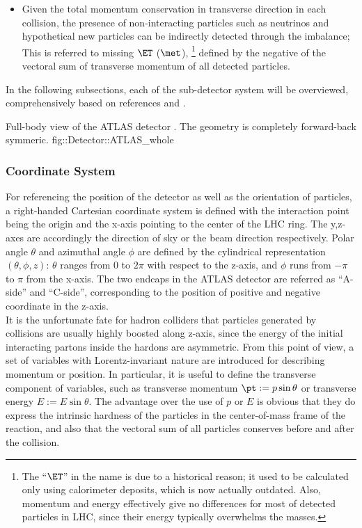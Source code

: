 \begin{itemize}
\item Given the total momentum conservation in transverse direction in each collision, 
the presence of non-interacting particles such as neutrinos and hypothetical new particles can be indirectly detected through the imbalance; 
This is referred to missing $\ET$ ($\met$), 
\footnote{The ``$\ET$'' in the name is due to a historical reason; it used to be calculated only using calorimeter deposits, which is now actually outdated. 
Also, momentum and energy effectively give no differences for most of detected particles in LHC, since their energy typically overwhelms the masses.}
defined by the negative of the vectoral sum of transverse momentum of all detected particles.
\end{itemize}


In the following subsections, each of the sub-detector system will be overviewed, comprehensively based on references \cite{ATLAS_exp} and \cite{ATLAS_TDR}.

{Full-body view of the ATLAS detector \cite{ATLAScosmicPerf}. The geometry is completely forward-back symmeric.}
{fig::Detector::ATLAS_whole}


\subsubsection{Coordinate System}
For referencing the position of the detector as well as the orientation of particles, a right-handed Cartesian coordinate system is defined with the interaction point being the origin and the x-axis pointing to the center of the LHC ring. The y,z-axes are accordingly the direction of sky or the beam direction respectively. Polar angle $\theta$ and azimuthal angle $\phi$ are defined by the cylindrical representation $(\theta,\phi,z)$: $\theta$ ranges from 0 to $2\pi$ with respect to the z-axis, and $\phi$ runs from $-\pi$ to $\pi$ from the x-axis. The two endcaps in the ATLAS detector are referred as ``A-side'' and ``C-side'', corresponding to the position of positive and negative coordinate in the z-axis. \\

It is the unfortunate fate for hadron colliders that particles generated by collisions are usually highly boosted along z-axis, since the energy of the initial interacting partons inside the hardons are asymmetric. From this point of view, a set of variables with Lorentz-invariant nature are introduced for describing momentum or position. In particular, it is useful to define the transverse component of variables, such as transverse momentum $\pt := p\sin{\theta}$ or transverse energy $E := E\sin{\theta}$. The advantage over the use of $p$ or $E$ is obvious that they do express the intrinsic hardness of the particles in the center-of-mass frame of the reaction, and also that the vectoral sum of all particles conserves before and after the collision. \\

